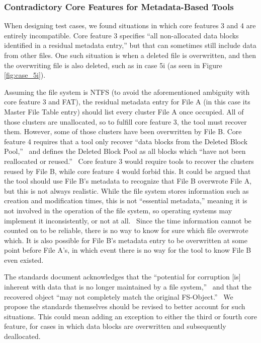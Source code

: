 \documentclass{ws-rv9x6}
\newenvironment{paraphrase}{\color{blue}}{\color{black}} %
\begin{document}
\subsubsection{Contradictory Core Features for Metadata-Based Tools}
\begin{paraphrase}
When designing test cases, we found situations in which core features 3 and 4 are entirely incompatible. 
Core feature 3 specifies ``all non-allocated data blocks identified in a residual metadata entry,''\cite{meta:dfr:standards} but that can sometimes still include data from other files. 
One such situation is when a deleted file is overwritten, and then the overwriting file is also deleted, such as in case 5i (as seen in Figure \ref{fig:case_5i}).


Assuming the file system is NTFS (to avoid the aforementioned ambiguity with core feature 3 and FAT), the residual metadata entry for File A (in this case its Master File Table entry) should list every cluster File A once occupied. 
All of those clusters are unallocated, so to fulfill core feature 3, the tool must recover them. 
However, some of those clusters have been overwritten by File B. Core feature 4 requires that a tool only recover ``data blocks from the Deleted Block Pool,''~\cite{meta:dfr:standards} and defines the Deleted Block Pool as all blocks which ``have not been reallocated or reused.''~\cite{meta:dfr:standards}
Core feature 3 would require tools to recover the clusters reused by File B, while core feature 4 would forbid this. 
It could be argued that the tool should use File B's metadata to recognize that File B overwrote File A, but this is not always realistic. 
While the file system stores information such as creation and modification times, this is not ``essential metadata,'' meaning it is not involved in the operation of the file system, so operating systems may implement it inconsistently, or not at all.~\cite{carrier:filesystems}
Since the time information cannot be counted on to be reliable, there is no way to know for sure which file overwrote which. 
It is also possible for File B's metadata entry to be overwritten at some point before File A's, in which event there is no way for the tool to know File B even existed.

The standards document acknowledges that the ``potential for corruption [is] inherent with data that is no longer maintained by a file system,''~\cite{meta:dfr:standards} and that the recovered object ``may not completely match the original FS-Object.''~\cite{meta:dfr:standards}
We propose the standards themselves should be revised to better account for such situations.
This could mean adding an exception to either the third or fourth core feature, for cases in which data blocks are overwritten and subsequently deallocated.


\end{paraphrase}
\end{document}

